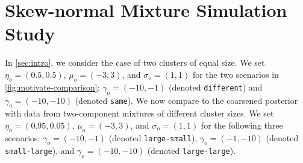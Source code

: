 \section{Skew-normal Mixture Simulation Study}
\label{sec:simulation-gauss}


In \cref{sec:intro}, we consider the case of two clusters of equal size. 
We set $\eta_{o} = (0.5, 0.5)$, $\mu_{o} = (-3,3)$, and $\sigma_{o} = (1,1)$ for the two scenarios in \cref{fig:motivate-comparison}: $\gamma_o = (-10,-1)$ (denoted \texttt{different}) and $\gamma_o = (-10,-10)$ (denoted \texttt{same}).
We now compare \methodname to the coarsened posterior with data from
two-component mixtures of different cluster sizes. %
We set $\eta_{o} = (0.95, 0.05)$, $\mu_{o} = (-3,3)$, and $\sigma_{o} = (1,1)$ for the following three scenarios:
$\gamma_o = (-10,-1)$ (denoted \texttt{large-small}),  $\gamma_o = (-1,-10)$ (denoted \texttt{small-large}),
and  $\gamma_o = (-10,-10)$ (denoted \texttt{large-large}).

